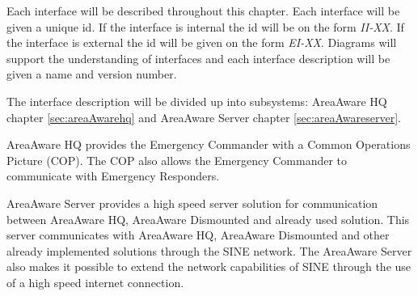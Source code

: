 Each interface will be described throughout this chapter. Each interface will be given a unique id. If the interface is internal the id will be on the form \emph{II-XX}. If the interface is external the id will be given on the form \emph{EI-XX}. Diagrams will support the understanding of interfaces and each interface description will be given a name and version number.

The interface description will be divided up into subsystems: AreaAware HQ chapter \ref{sec:areaAwarehq} and AreaAware Server chapter \ref{sec:areaAwareserver}.

AreaAware HQ provides the Emergency Commander with a Common Operations Picture (COP). The COP also allows the Emergency Commander to communicate with Emergency Responders.

AreaAware Server provides a high speed server solution for communication between AreaAware HQ, AreaAware Dismounted and already used solution. This server communicates with AreaAware HQ, AreaAware Dismounted and other already implemented solutions through the SINE network. The AreaAware Server also makes it possible to extend the network capabilities of SINE through the use of a high speed internet connection.

